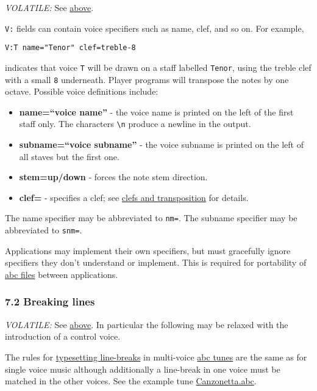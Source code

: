 \emph{VOLATILE:} See \protect\hyperlink{multiple_voices}{above}.

\texttt{V:} fields can contain voice specifiers such as name, clef, and
so on. For example,

\begin{verbatim}
V:T name="Tenor" clef=treble-8
\end{verbatim}

indicates that voice \texttt{T} will be drawn on a staff labelled
\texttt{Tenor}, using the treble clef with a small \texttt{8}
underneath. Player programs will transpose the notes by one octave.
Possible voice definitions include:

\begin{itemize}
\item
  \textbf{name=``voice name''} - the voice name is printed on the left
  of the first staff only. The characters \texttt{\textbackslash{}n}
  produce a newline in the output.
\item
  \textbf{subname=``voice subname''} - the voice subname is printed on
  the left of all staves but the first one.
\item
  \textbf{stem=up/down} - forces the note stem direction.
\item
  \textbf{clef=} - specifies a clef; see
  \protect\hyperlink{clefs_and_transposition}{clefs and transposition}
  for details.
\end{itemize}

The name specifier may be abbreviated to \texttt{nm=}. The subname
specifier may be abbreviated to \texttt{snm=}.

Applications may implement their own specifiers, but must gracefully
ignore specifiers they don't understand or implement. This is required
for portability of \protect\hyperlink{abc_file_definition}{abc files}
between applications.

\hypertarget{breaking_lines}{\subsubsection{7.2 Breaking
lines}\label{breaking_lines}}

\emph{VOLATILE:} See \protect\hyperlink{multiple_voices}{above}. In
particular the following may be relaxed with the introduction of a
control voice.

The rules for \protect\hyperlink{typesetting_line-breaks}{typesetting
line-breaks} in multi-voice \protect\hyperlink{abc_tune_definition}{abc
tunes} are the same as for single voice music although additionally a
line-break in one voice must be matched in the other voices. See the
example tune \protect\hyperlink{canzonettaabc}{Canzonetta.abc}.

